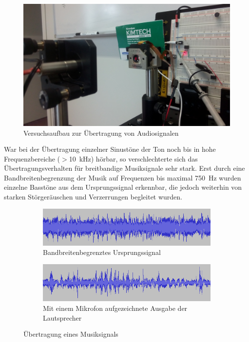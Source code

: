 \documentclass[12pt,a4paper]{article}
\begin{document}
\begin{figure}[H]
  \centering
    \includegraphics[width=\textwidth]{img/photo_lcd_experiment.jpg}
  \caption{Versuchsaufbau zur Übertragung von Audiosignalen}
  \label{fig:photo_lcd_experiment}
\end{figure}

War bei der Übertragung einzelner Sinustöne der Ton noch bis in hohe Frequenzbereiche ($>$\SI{10}{\kilo\hertz}) hörbar, so verschlechterte sich das Übertragungsverhalten für breitbandige Musiksignale sehr stark. Erst durch eine Bandbreitenbegrenzung der Musik auf Frequenzen bis maximal \SI{750}{\hertz} wurden einzelne Basstöne aus dem Ursprungssignal erkennbar, die jedoch weiterhin von starken Störgeräuschen und Verzerrungen begleitet wurden.

\begin{figure}[H]
  \centering
  \begin{subfigure}[b]{1.0\textwidth}
    \includegraphics[width=\textwidth]{../audacity_sent.png}
    \caption{Bandbreitenbegrenztes Ursprungssignal}
    \label{fig:audacity_sent}
  \end{subfigure}  
  \begin{subfigure}[b]{1.0\textwidth}
    \includegraphics[width=\textwidth]{../audacity_received.png}
    \caption{Mit einem Mikrofon aufgezeichnete Ausgabe der Lautsprecher}
    \label{fig:audacity_received}
  \end{subfigure}  
  \caption{Übertragung eines Musiksignals}
  \label{fig:audacity}
\end{figure}
\end{document}
